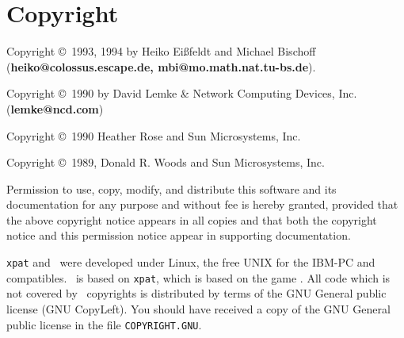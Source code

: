 \section{Copyright}
Copyright \copyright\ 1993, 1994 by Heiko Ei\ss{}feldt and Michael Bischoff\\
({\bf heiko@colossus.escape.de, mbi@mo.math.nat.tu-bs.de}).
\par\noindent
Copyright \copyright\ 1990 by David Lemke \& Network Computing Devices, Inc.\\
({\bf lemke@ncd.com})
\par\noindent
Copyright \copyright\ 1990 Heather Rose and Sun Microsystems, Inc.
\par\noindent
Copyright \copyright\ 1989, Donald R. Woods and Sun Microsystems, Inc.
\par\smallskip\noindent
Permission to use, copy, modify, and distribute this software and its
documentation for any purpose and without fee is hereby granted,
provided that the above copyright notice appears in all copies and that
both the copyright notice and this permission notice appear in
supporting documentation. 

\medskip\noindent
{\tt xpat} and \xpat\ were developed under Linux, the free UNIX for the IBM-PC
and compatibles.
\xpat\ is based on {\tt xpat}, which is based on the game \spider.
All code which is not covered by \spider\ copyrights
is distributed by terms of the GNU General public license (GNU CopyLeft).
You should have received a copy of the GNU General public license in the file
{\tt COPYRIGHT.GNU}.
